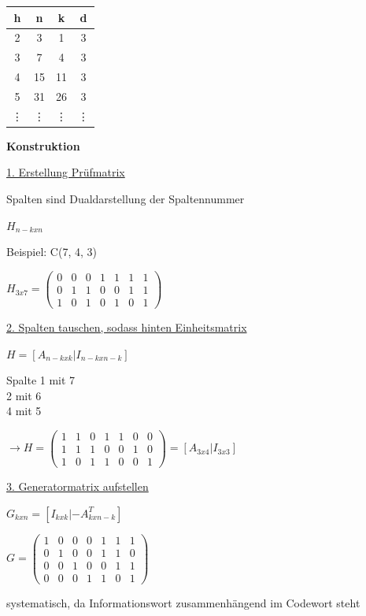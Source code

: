 \begin{tabular}{c|c c c}
    h & n & k & d\\
    \hline
    2 & 3 & 1 & 3\\
    3 & 7 & 4 & 3\\
    4 & 15 & 11 & 3\\
    5 & 31 & 26 & 3\\
    \vdots & \vdots & \vdots & \vdots
\end{tabular}

\textbf{Konstruktion}

\underline{1. Erstellung Prüfmatrix}

Spalten sind Dualdarstellung der Spaltennummer

$H_{n-k x n}$

Beispiel: C(7, 4, 3)

$\displaystyle{
    H_{3 x 7} = \begin{pmatrix}
        0 & 0 & 0 & 1 & 1 & 1 & 1\\
        0 & 1 & 1 & 0 & 0 & 1 & 1\\
        1 & 0 & 1 & 0 & 1 & 0 & 1
    \end{pmatrix}
}$

\underline{2. Spalten tauschen, sodass hinten Einheitsmatrix}

$H = [A_{n-k x k} | I_{n-k x n-k} ]$

Spalte 1 mit 7\\
2 mit 6\\
4 mit 5

$\displaystyle{
    \rightarrow H = \begin{pmatrix}
        1 & 1 & 0 & 1 & 1 & 0 & 0\\
        1 & 1 & 1 & 0 & 0 & 1 & 0\\
        1 & 0 & 1 & 1 & 0 & 0 & 1
    \end{pmatrix} = [ A_{3 x 4} | I_{3 x 3} ]
}$

\underline{3. Generatormatrix aufstellen}

$G_{k x n} = [I_{k x k} | -A^T_{k x n-k} ]$

$\displaystyle{
    G = \begin{pmatrix}
        1 & 0 & 0 & 0 & 1 & 1 & 1\\
        0 & 1 & 0 & 0 & 1 & 1 & 0\\
        0 & 0 & 1 & 0 & 0 & 1 & 1\\
        0 & 0 & 0 & 1 & 1 & 0 & 1
    \end{pmatrix}
}$

systematisch, da Informationswort zusammenhängend im Codewort steht

